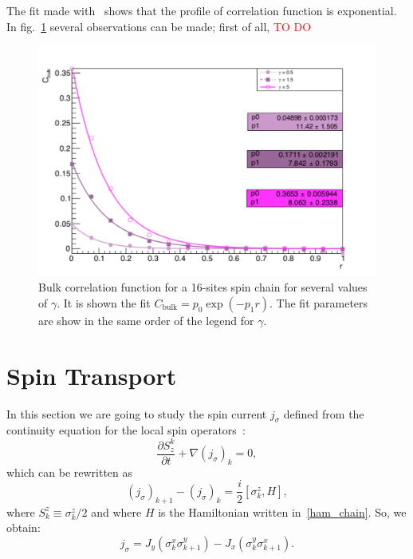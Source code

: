 The fit made with~\cite{root_cern} shows that the profile of correlation function is exponential. In fig.~\ref{fig:FIT_16sites_CFBulkCONN} several observations can be made; first of all, \textcolor{red}{TO DO}

\begin{figure}[H]
    \centering
    \includegraphics[scale=0.7]{Figures/16sites/FIT_16sites_CFBulkCONN.pdf}
    \captionsetup{width=1.\linewidth}
    \caption{Bulk correlation function for a 16-sites spin chain for several values of $\gamma$. It is shown the fit $C_{\text{bulk}} = p_0 \exp{(-p_1 r)}$. The fit parameters are show in the same order of the legend for $\gamma$.}
    \label{fig:FIT_16sites_CFBulkCONN}
\end{figure}


\section{Spin Transport}
In this section we are going to study the spin current $j_\sigma$ defined from the continuity equation for the local spin operators~\cite{BenentiCasatiProsenRossini}:
\begin{equation}
    \frac{\partial S^k_z}{\partial t} + \nabla (j_\sigma)_k = 0,
\end{equation}
which can be rewritten as
\begin{equation}
    (j_\sigma)_{k+1}-(j_\sigma)_k = \frac{i}{2}[\sigma_k^z , H],
\end{equation}
where $S_k^z \equiv \sigma_k^z/2$ and where $H$ is the Hamiltonian written in~\ref{ham_chain}. So, we obtain:
\begin{equation}
    j_\sigma = J_y (\sigma_k^x \sigma_{k+1}^y) - J_x (\sigma_k^y \sigma_{k+1}^x). 
\end{equation}


